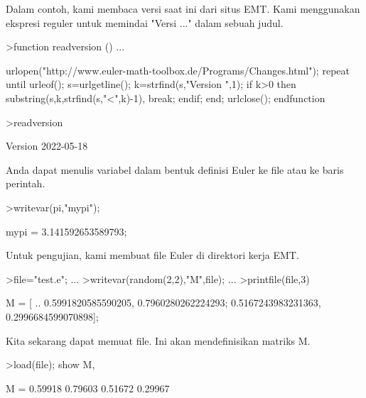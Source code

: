 \documentclass{article}
\begin{document}
\begin{eulernotebook}
\begin{eulercomment}
\begin{eulercomment}
\begin{eulercomment}
Dalam contoh, kami membaca versi saat ini dari situs EMT. Kami
menggunakan ekspresi reguler untuk memindai "Versi ..." dalam sebuah
judul.
\end{eulercomment}
\begin{eulerprompt}
>function readversion () ...
\end{eulerprompt}
\begin{eulerudf}
  urlopen("http://www.euler-math-toolbox.de/Programs/Changes.html");
  repeat
    until urleof();
    s=urlgetline();
    k=strfind(s,"Version ",1);
    if k>0 then substring(s,k,strfind(s,"<",k)-1), break; endif;
  end;
  urlclose();
  endfunction
\end{eulerudf}
\begin{eulerprompt}
>readversion
\end{eulerprompt}
\begin{euleroutput}
  Version 2022-05-18
\end{euleroutput}
\begin{eulercomment}
Anda dapat menulis variabel dalam bentuk definisi Euler ke file atau
ke baris perintah.
\end{eulercomment}
\begin{eulerprompt}
>writevar(pi,"mypi");
\end{eulerprompt}
\begin{euleroutput}
  mypi = 3.141592653589793;
\end{euleroutput}
\begin{eulercomment}
Untuk pengujian, kami membuat file Euler di direktori kerja EMT.
\end{eulercomment}
\begin{eulerprompt}
>file="test.e"; ...
>writevar(random(2,2),"M",file); ...
>printfile(file,3)
\end{eulerprompt}
\begin{euleroutput}
  M = [ ..
  0.5991820585590205, 0.7960280262224293;
  0.5167243983231363, 0.2996684599070898];
\end{euleroutput}
\begin{eulercomment}
Kita sekarang dapat memuat file. Ini akan mendefinisikan matriks M.
\end{eulercomment}
\begin{eulerprompt}
>load(file); show M,
\end{eulerprompt}
\begin{euleroutput}
  M = 
    0.59918   0.79603 
    0.51672   0.29967 
\end{euleroutput}

\end{eulercomment}
\end{eulercomment}
\end{eulernotebook}
\end{document}
